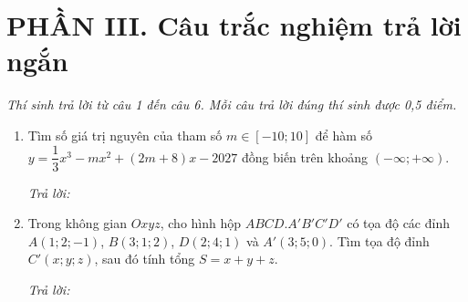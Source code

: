 \documentclass[12pt,a4paper]{article}
\newcommand{\otraloi}{\par\nobreak\smallskip\noindent\textit{Trả lời:}\quad\fbox{\rule{0pt}{11pt}\makebox[0.3cm]{}}\,\fbox{\rule{0pt}{11pt}\makebox[0.3cm]{}}\,\fbox{\rule{0pt}{11pt}\makebox[0.3cm]{}}\,\fbox{\rule{0pt}{11pt}\makebox[0.3cm]{}}}
\begin{document}
\vspace{3pt}
\section*{\large PHẦN III. Câu trắc nghiệm trả lời ngắn}
\textit{Thí sinh trả lời từ câu 1 đến câu 6. Mỗi câu trả lời đúng thí sinh được 0,5 điểm.}
\begin{enumerate}
\item Tìm số giá trị nguyên của tham số $m\in[-10;10]$ để hàm số $y=\dfrac{1}{3}x^3-mx^2+(2m+8)x-2027$ đồng biến trên khoảng $(-\infty;+\infty)$.
\otraloi

\item Trong không gian $Oxyz$, cho hình hộp $ABCD.A'B'C'D'$ có tọa độ các đỉnh $A(1;2;-1)$, $B(3;1;2)$, $D(2;4;1)$ và $A'(3;5;0)$. Tìm tọa độ đỉnh $C'(x;y;z)$, sau đó tính tổng $S=x+y+z$.
\otraloi
\end{enumerate}
\end{document}
